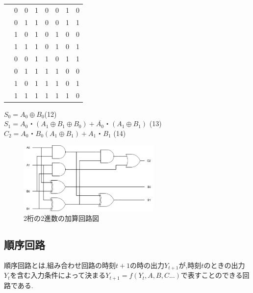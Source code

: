 \documentclass[twocolumn, 10pt,a4j]{jsarticle}
\begin{document}
\begin{enumerate}
\begin{table}[H]
\begin{tabular}{l|llll|lll}
            & 0       & 0       & 1       & 0       & 0       & 1       & 0       \\
            & 0       & 1       & 1       & 0       & 0       & 1       & 1       \\
            & 1       & 0       & 1       & 0       & 1       & 0       & 0       \\
            & 1       & 1       & 1       & 0       & 1       & 0       & 1       \\
            & 0       & 0       & 1       & 1       & 0       & 1       & 1       \\
            & 0       & 1       & 1       & 1       & 1       & 0       & 0       \\
            & 1       & 0       & 1       & 1       & 1       & 0       & 1       \\
            & 1       & 1       & 1       & 1       & 1       & 1       & 0      
        \end{tabular}
      \end{table}
      $S_{0} = A_{0} \oplus B_{0} $\quad(12) \\
      $S_{1} = A_{0}・(A_{1} \oplus B_{1} \oplus B_{0}) + \overline{A_{0}}・(A_{1} \oplus B_{1})$ \quad(13) \\
      $C_{2} = A_{0}・B_{0}(A_{1} \oplus B_{1}) + A_{1}・B_{1}$ \quad(14) \\
      \begin{figure}[H]
        \begin{center}
          \includegraphics[width=7cm]{../img/half_adder/ronri.png}
          \caption{2桁の2進数の加算回路図}
        \end{center}
      \end{figure}
    \end{enumerate}
\subsection{順序回路}
  順序回路とは,組み合わせ回路の時刻$t+1$の時の出力$Y_{t+1}$が,時刻$t$のときの出力
  $Y_{t}$を含む入力条件によって決まる$Y_{t+1} = f(Y_{t},A,B,C...)$で表すことのできる回路である.
\end{document}
